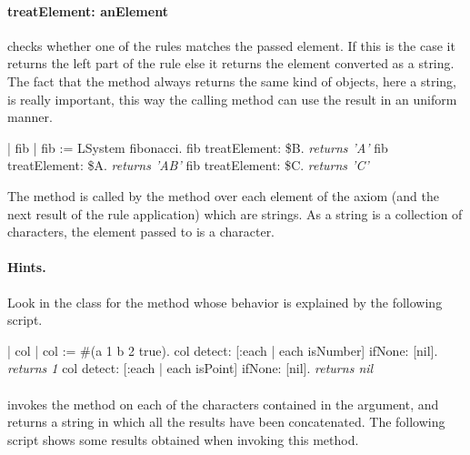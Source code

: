 \paragraph{treatElement: anElement} checks whether one of the 
rules matches the passed element. If this is the case it returns the
left part of the rule else it returns the element converted as a
string. The fact that the method always returns the same kind of
objects, here a string, is really important, this way the calling
method can use the result in an uniform manner.

\begin{scriptwithouttitle}
| fib |
fib := LSystem fibonacci.
fib treatElement: \$B.
\emph{returns 'A'}
fib treatElement: \$A.
\emph{returns 'AB'}
fib treatElement: \$C.
\emph{returns 'C'}
\end{scriptwithouttitle}

The method  is called by the method
 over each element of the axiom (and the next
result of the rule application) which are strings. As a string is a
collection of characters, the element passed to  is a
character.

\paragraph{Hints.} Look in the  class for 
the method  whose behavior
is explained by the following script.

\begin{scriptwithouttitle}
| col |
col := #(a 1 b 2 true).
col detect: [:each | each isNumber] ifNone: [nil].
\emph{returns 1}
col detect: [:each | each isPoint] ifNone: [nil].
\emph{returns nil}
\end{scriptwithouttitle}



\paragraph{} invokes the method  on 
each of the characters contained in the argument,  and
returns a string in which all the results have been concatenated. The
following script shows some results obtained when invoking this
method.

